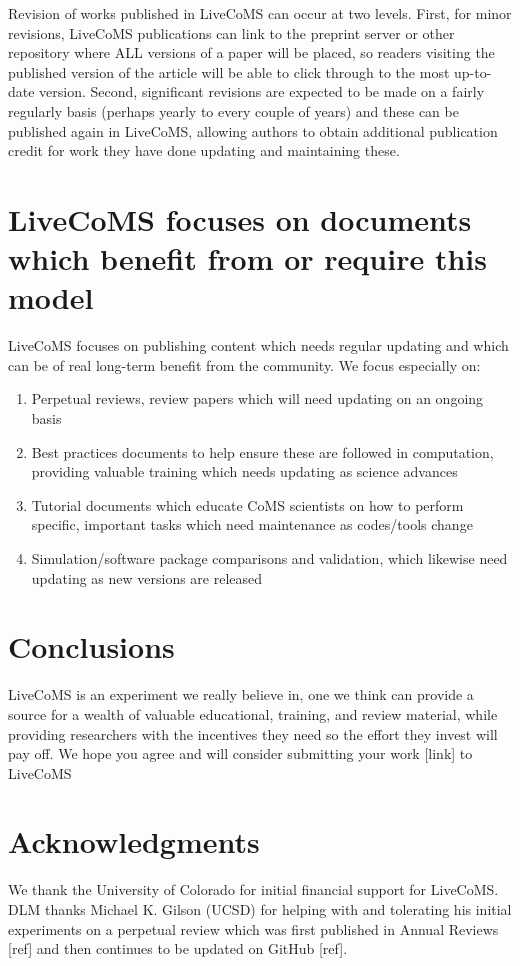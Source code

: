\documentclass[9pt,lineno]{livecoms}
\begin{document}
Revision of works published in LiveCoMS can occur at two levels. 
First, for minor revisions, LiveCoMS publications can link to the preprint server or other repository where ALL versions of a paper will be placed, so readers visiting the published version of the article will be able to click through to the most up-to-date version.
Second, significant revisions are expected to be made on a fairly regularly basis (perhaps yearly to every couple of years) and these can be published again in LiveCoMS, allowing authors to obtain additional publication credit for work they have done updating and maintaining these. 

\section{LiveCoMS focuses on documents which benefit from or require this model}

LiveCoMS focuses on publishing content which needs regular updating and which can be of real long-term benefit from the community.
We focus especially on:
\begin{enumerate}
\item Perpetual reviews, review papers which will need updating on an ongoing basis
\item Best practices documents to help ensure these are followed in computation, providing valuable training which needs updating as science advances
\item Tutorial documents which educate CoMS scientists on how to perform specific, important tasks which need maintenance as codes/tools change
\item Simulation/software package comparisons and validation, which likewise need updating as new versions are released
\end{enumerate}

\section{Conclusions}

LiveCoMS is an experiment we really believe in, one we think can provide a source for a wealth of valuable educational, training, and review material, while providing researchers with the incentives they need so the effort they invest will pay off.
We hope you agree and will consider submitting your work [link] to LiveCoMS


\section{Acknowledgments}

We thank the University of Colorado for initial financial support for LiveCoMS. 
DLM thanks Michael K. Gilson (UCSD) for helping with and tolerating his initial experiments on a perpetual review which was first published in Annual Reviews [ref] and then continues to be updated on GitHub [ref].


\end{document}
